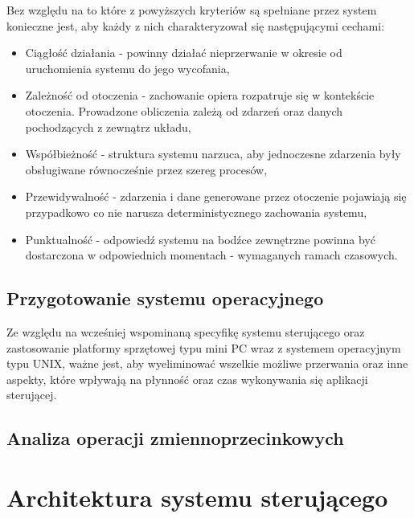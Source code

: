 Bez względu na to które z powyższych kryteriów są spełniane przez system konieczne jest, aby każdy z nich charakteryzował się następującymi cechami:

\begin{itemize}
	\item Ciągłość działania - powinny działać nieprzerwanie w okresie od uruchomienia systemu do jego wycofania,
	
	\item Zależność od otoczenia - zachowanie opiera rozpatruje się w kontekście otoczenia. Prowadzone obliczenia zależą od zdarzeń oraz danych pochodzących z zewnątrz układu,
	
	\item Współbieżność - struktura systemu narzuca, aby jednoczesne zdarzenia były obsługiwane równocześnie przez szereg procesów,
	
	\item Przewidywalność - zdarzenia i dane generowane przez otoczenie pojawiają się przypadkowo co nie narusza deterministycznego zachowania systemu,
	
	\item Punktualność - odpowiedź systemu na bodźce zewnętrzne powinna być dostarczona w odpowiednich momentach - wymaganych ramach czasowych.
\end{itemize}



\subsection{Przygotowanie systemu operacyjnego}
Ze względu na wcześniej wspominaną specyfikę systemu sterującego oraz zastosowanie platformy sprzętowej typu mini PC wraz z systemem operacyjnym typu UNIX, ważne jest, aby wyeliminować wszelkie możliwe przerwania oraz inne aspekty, które wpływają na płynność oraz czas wykonywania się aplikacji sterującej.




\subsection{Analiza operacji zmiennoprzecinkowych}


\section{Architektura systemu sterującego}
